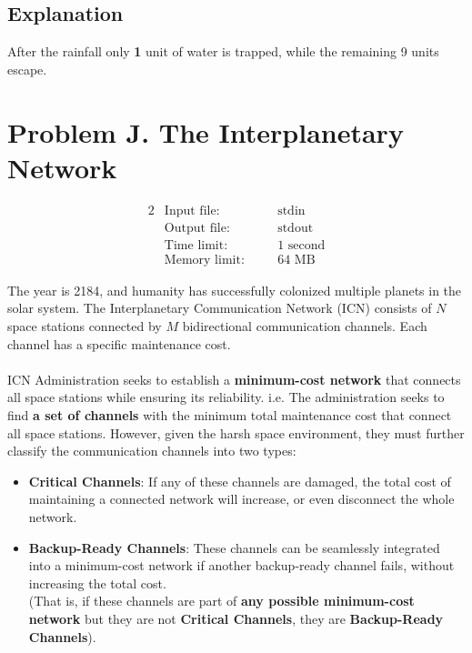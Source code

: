 \documentclass[12pt,a4paper]{article}
\begin{document}
\subsection*{\fontsize{16}{12}Explanation}
\noindent
After the rainfall only \textbf{1} unit of water is trapped, while the remaining 9 units escape.
\newpage

\section*{\fontsize{18}{12}Problem J. The Interplanetary Network}

\begin{alignat*} {2}
 &   \text{Input file:}   \quad     &&\text{stdin}\\
 &   \text{Output file:}  \quad     &&\text{stdout}\\
 &   \text{Time limit:}   \quad     &&\text{1 second}\\
 &   \text{Memory limit:} \quad     &&\text{64 MB}
\end{alignat*}

\noindent
The year is 2184, and humanity has successfully colonized multiple planets in the solar system. The Interplanetary Communication Network (ICN) consists of \( N \) space stations connected by \( M \) bidirectional communication channels. Each channel has a specific maintenance cost.
\\\\
\noindent
ICN Administration seeks to establish a \textbf{minimum-cost network} that connects all space stations while ensuring its reliability. i.e. The administration seeks to find \textbf{a set of channels} with the minimum total maintenance cost that connect all space stations. However, given the harsh space environment, they must further classify the communication channels into two types:

\begin{itemize}
    \item \textbf{Critical Channels}: If any of these channels are damaged, the total cost of maintaining a connected network will increase, or even disconnect the whole network.
    \item \textbf{Backup-Ready Channels}: These channels can be seamlessly integrated into a minimum-cost network if another backup-ready channel fails, without increasing the total cost.\\ (That is, if these channels are part of \textbf{any possible minimum-cost network} but they are not \textbf{Critical Channels}, they are \textbf{Backup-Ready Channels}).
\end{itemize}
\end{document}
